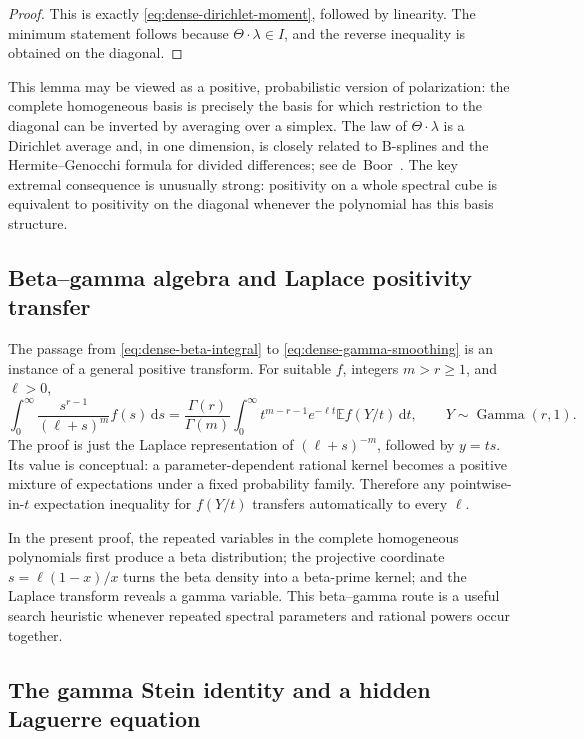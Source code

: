 \documentclass[11pt]{article}
\newcommand{\dd}{\,\mathrm d}
\newcommand{\E}{\mathbb E}
\newcommand{\GammaLaw}{\operatorname{Gamma}}
\begin{document}
\begin{proof}
This is exactly \eqref{eq:dense-dirichlet-moment}, followed by linearity.
The minimum statement follows because \(\Theta\cdot\lambda\in I\), and the
reverse inequality is obtained on the diagonal.
\end{proof}

This lemma may be viewed as a positive, probabilistic version of
polarization: the complete homogeneous basis is precisely the basis for
which restriction to the diagonal can be inverted by averaging over a
simplex.  The law of \(\Theta\cdot\lambda\) is a Dirichlet average and, in
one dimension, is closely related to B-splines and the Hermite--Genocchi
formula for divided differences; see de~Boor~\cite{deBoor2005}.  The key
extremal consequence is unusually strong: positivity on a whole spectral
cube is equivalent to positivity on the diagonal whenever the polynomial
has this basis structure.

\subsection{Beta--gamma algebra and Laplace positivity transfer}

The passage from \eqref{eq:dense-beta-integral} to
\eqref{eq:dense-gamma-smoothing} is an instance of a general positive
transform.  For suitable \(f\), integers \(m>r\ge1\), and \(\ell>0\),
\begin{equation}\label{eq:general-laplace-transfer}
 \int_0^\infty\frac{s^{r-1}}{(\ell+s)^m}f(s)\dd s
 =\frac{\Gamma(r)}{\Gamma(m)}
  \int_0^\infty t^{m-r-1}e^{-\ell t}
       \E f(Y/t)\dd t,
 \qquad Y\sim\GammaLaw(r,1).
\end{equation}
The proof is just the Laplace representation of \((\ell+s)^{-m}\), followed
by \(y=ts\).  Its value is conceptual: a parameter-dependent rational
kernel becomes a positive mixture of expectations under a fixed
probability family.  Therefore any pointwise-in-\(t\) expectation inequality
for \(f(Y/t)\) transfers automatically to every \(\ell\).

In the present proof, the repeated variables in the complete homogeneous
polynomials first produce a beta distribution; the projective coordinate
\(s=\ell(1-x)/x\) turns the beta density into a beta-prime kernel; and the
Laplace transform reveals a gamma variable.  This beta--gamma route is a
useful search heuristic whenever repeated spectral parameters and rational
powers occur together.

\subsection{The gamma Stein identity and a hidden Laguerre equation}
\end{document}
